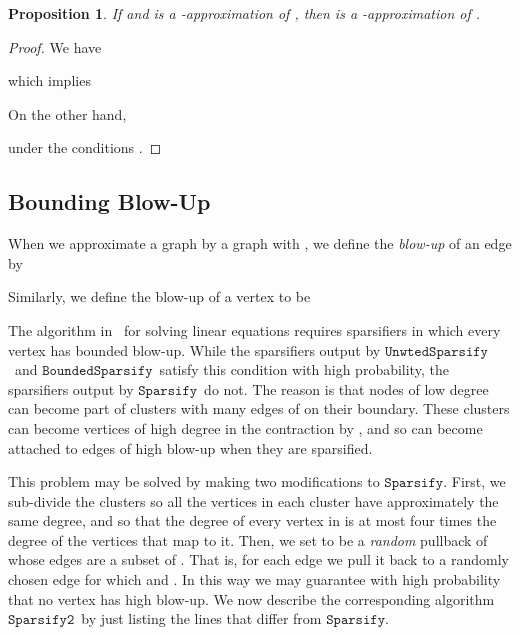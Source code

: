 \documentclass[11pt]{article}
\newtheorem{proposition}[theorem]{Proposition}
\newcommand{\sparsify}{\ensuremath{\mathtt{Sparsify}}}
\newcommand{\sparsifytwo}{\ensuremath{\mathtt{Sparsify2}}}
\newcommand{\unwtedsparsify}{\ensuremath{\mathtt{UnwtedSparsify}}}
\newcommand{\boundedsparsify}{\ensuremath{\mathtt{BoundedSparsify}}}
\begin{document}
\begin{proposition}\label{pro:sparsifyCalc}
If  and
  is a -approximation of ,
  then
 is a -approximation of .
\end{proposition}
\begin{proof}
We have

which implies



On the other hand,

under the conditions .
\end{proof}


\subsection{Bounding Blow-Up}\label{ssec:blowup}
When we approximate a graph  by a graph
   with ,
  we define the \textit{blow-up} of an edge 
  by

Similarly, we define the blow-up of a vertex  to be

The algorithm in~\cite{SpielmanTengLinsolve} for solving linear equations
  requires sparsifiers in which every vertex has bounded blow-up.
While the sparsifiers output by \unwtedsparsify \ and \boundedsparsify \
  satisfy this condition with high probability,
  the sparsifiers output by \sparsify  \ do not.
The reason is that nodes of low degree can become part of clusters
   with many edges of  on their boundary.
These clusters can become vertices of high degree in the contraction by ,
  and so can become attached to edges of high blow-up when they are sparsified.

This problem may be solved by making two modifications to \sparsify .
First, we sub-divide the clusters  so all the vertices in each
  cluster have approximately the same degree, and so that
  the degree of every vertex in  is at most four times the degree
  of the vertices that map to it.
Then,
  we set  to be a \textit{random} pullback of 
  whose edges are a subset of .
That is, for each edge  we pull it back to a randomly
  chosen edge  for which  and .
In this way we may guarantee with high probability that no vertex
  has high blow-up.
We now describe the corresponding algorithm \sparsifytwo \ by just listing
  the lines that differ from \sparsify.
\end{document}
